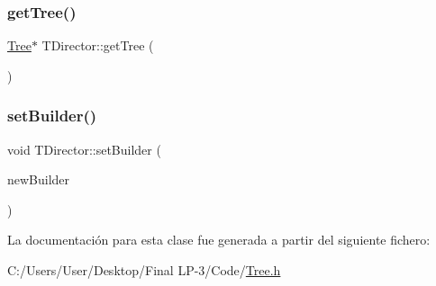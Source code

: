 \mbox{\label{class_t_director_aca5fe67cd7f33ebb8edc9c1e10ef7316}} 
\subsubsection{\texorpdfstring{getTree()}{getTree()}}
{\footnotesize\ttfamily \mbox{\hyperlink{class_tree}{Tree}}$\ast$ T\+Director\+::get\+Tree (\begin{DoxyParamCaption}{ }\end{DoxyParamCaption})\hspace{0.3cm}{\ttfamily [inline]}}

\mbox{\label{class_t_director_a9dc2e7bc1a9fa5d9033ee4cc48c7ac3f}} 
\subsubsection{\texorpdfstring{setBuilder()}{setBuilder()}}
{\footnotesize\ttfamily void T\+Director\+::set\+Builder (\begin{DoxyParamCaption}\item[{\mbox{\hyperlink{class_t_builder}{T\+Builder}} $\ast$}]{new\+Builder }\end{DoxyParamCaption})\hspace{0.3cm}{\ttfamily [inline]}}



La documentación para esta clase fue generada a partir del siguiente fichero\+:\begin{DoxyCompactItemize}
\item 
C\+:/\+Users/\+User/\+Desktop/\+Final L\+P-\/3/\+Code/\mbox{\hyperlink{_tree_8h}{Tree.\+h}}\end{DoxyCompactItemize}
